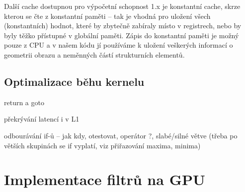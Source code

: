         Další cache dostupnou pro výpočetní schopnost 1.x je konstantní cache, skrze kterou se čte z konstantní paměti -- tak je vhodná pro uložení všech (konstantních) hodnot, které by zbytečně zabíraly místo v registrech, nebo by byly těžko přístupné v globální paměti. Zápis do konstantní paměti je možný pouze z CPU a v našem kódu jí používáme k uložení veškerých informací o geometrii obrazu a neměnných částí strukturních elementů. 
    
    \subsection{Optimalizace běhu kernelu}
return a goto

překrývání latencí i v L1

odbourávání if-ů -- jak kdy, otestovat, operátor ?,
slabé/silné větve (třeba po větších skupinách se if vyplatí,
viz přiřazování maxima, minima) 

\section{Implementace filtrů na GPU}